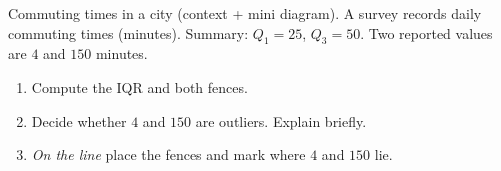 \documentclass[11pt]{article}
\def\textbf#1{#1}%
\newcounter{question}
\begin{document}
\begin{question}
\textbf{Commuting times in a city (context + mini diagram).}
A survey records daily commuting times (minutes). Summary: $Q_1=25$, $Q_3=50$.  
Two reported values are $4$ and $150$ minutes.
\begin{enumerate}
  \item Compute the IQR and both fences.
  \item Decide whether $4$ and $150$ are outliers. Explain briefly.
  \item \emph{On the line} place the fences and mark where $4$ and $150$ lie.
\end{enumerate}

\begin{center}
\end{center}
\end{question}

\end{document}
